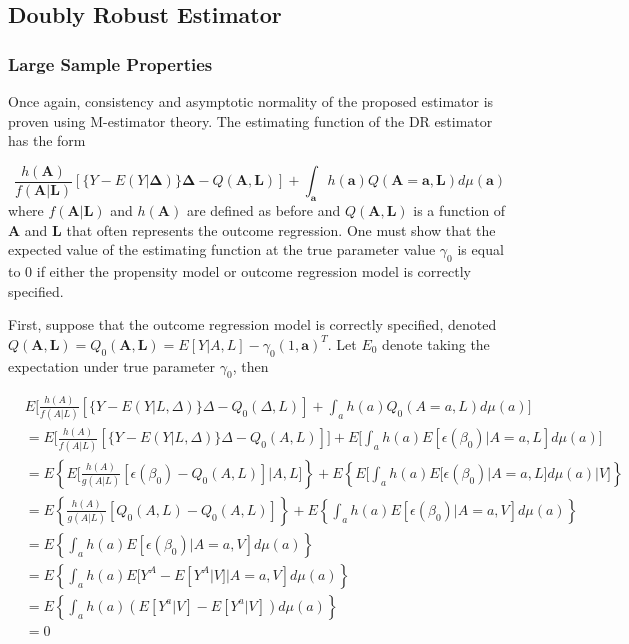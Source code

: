 \documentclass[12pt]{article}
\begin{document}
\subsection{Doubly Robust Estimator}

\subsubsection{Large Sample Properties}

Once again, consistency and asymptotic normality of the proposed estimator is proven using M-estimator theory. The estimating function of the DR estimator has the form

\begin{equation}
\frac{h(\bm{A})}{f(\bm{A} | \bm{L})} [\{Y - E(Y | \bm{\Delta})\}\bm{\Delta} - Q(\bm{A}, \bm{L})] + \int_{\bm{a}} h(\bm{a})Q(\bm{A} = \bm{a}, \bm{L})d\mu (\bm{a})
\end{equation}
where $f(\bm{A}|\bm{L})$ and $h(\bm{A})$ are defined as before and $Q(\bm{A}, \bm{L})$ is a function of $\bm{A}$ and $\bm{L}$ that often represents the outcome regression. One must show that the expected value of the estimating function at the true parameter value $\gamma_{0}$ is equal to 0 if either the propensity model or outcome regression model is correctly specified.

First, suppose that the outcome regression model is correctly specified, denoted $Q(\bm{A}, \bm{L}) = Q_{0}(\bm{A}, \bm{L}) = E[Y | A, L] - \gamma_{0}(1, \bm{a})^{T}$. Let $E_{0}$ denote taking the expectation under true parameter $\gamma_{0}$, then

\begin{align*}
&E \bigg[\frac{h(A)}{f(A | L)}[ \{ Y - E(Y | L, \Delta) \}\Delta - Q_{0}(\Delta, L)] + \int_{a} h(a)Q_{0}(A = a, L)d\mu (a) \bigg] \\
&= E \bigg[\frac{h(A)}{f(A | L)}[\{ Y - E(Y | L, \Delta) \}\Delta - Q_{0}(A, L)] \bigg] + E \bigg[\int_{a} h(a)E[\epsilon(\beta_{0}) | A = a, L]d\mu (a) \bigg] \\
&= E \left \{ E \bigg[\frac{h(A)}{g(A | L)}[\epsilon(\beta_{0}) - Q_{0}(A, L)] | A, L \bigg] \right \} + E \left \{ E \bigg[\int_{a} h(a)E[\epsilon(\beta_{0}) | A = a, L]d\mu (a) | V \bigg] \right \} \\
&= E \left \{ \frac{h(A)}{g(A | L)}[Q_{0}(A, L) - Q_{0}(A, L)] \right \} + E \left \{ \int_{a} h(a)E[\epsilon(\beta_{0}) | A = a, V]d\mu (a) \right \} \\
&= E \left \{ \int_{a} h(a)E[\epsilon(\beta_{0}) | A = a, V]d\mu (a) \right \} \\
&= E \left \{ \int_{a} h(a)E[Y^{A} - E[Y^{A} | V] | A = a, V]d\mu (a) \right \} \\
&= E \left \{ \int_{a} h(a)(E[Y^{a} | V] - E[Y^{a} |V])d\mu (a) \right \} \\
&= 0
\end{align*}
\end{document}
